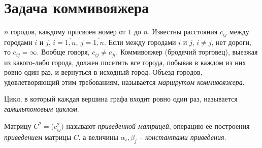 \newpage

\section{Задача коммивояжера}


\begin{definition}
  $n$ городов, каждому присвоен номер от $1$ до $n$. Известны расстояния $c_{ij} $ между городами $i$ и $j$, $i = \overline{1,n}, \ j = \overline{1,n}$. Если между городами $i$ и $j$, $i \ne j$, нет дороги, то $c_{ij} = \infty $. Вообще говоря, $c_{ij} \ne c_{ji} $. Коммивояжер (бродячий торговец), выезжая из какого-либо города, должен посетить все города, побывав в каждом из них ровно один раз, и вернуться в исходный город. Объезд городов, удовлетворяющий этим требованиям, называется \emph{маршрутом коммивояжера}.
\end{definition}

\begin{definition}
  Цикл, в который каждая вершина графа входит ровно один раз, называется \emph{гамильтоновым циклом}.
\end{definition}

\begin{definition}
  Матрицу $C^2 = \big(c_{ij}^{2} \big)$ называют \emph{приведенной матрицей}, операцию ее построения -- \emph{приведением} матрицы $C$, а величины $\alpha _i, \beta _j$ -- \emph{константами приведения}.
\end{definition}
